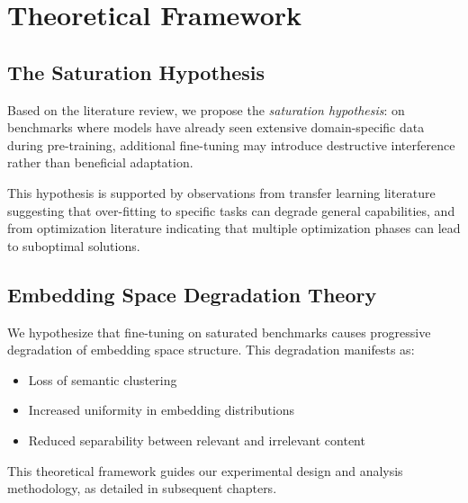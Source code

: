 \section{Theoretical Framework}

\subsection{The Saturation Hypothesis}

Based on the literature review, we propose the \textit{saturation hypothesis}: on benchmarks where models have already seen extensive domain-specific data during pre-training, additional fine-tuning may introduce destructive interference rather than beneficial adaptation.

This hypothesis is supported by observations from transfer learning literature suggesting that over-fitting to specific tasks can degrade general capabilities, and from optimization literature indicating that multiple optimization phases can lead to suboptimal solutions.

\subsection{Embedding Space Degradation Theory}

We hypothesize that fine-tuning on saturated benchmarks causes progressive degradation of embedding space structure. This degradation manifests as:

\begin{itemize}
\item Loss of semantic clustering
\item Increased uniformity in embedding distributions
\item Reduced separability between relevant and irrelevant content
\end{itemize}

This theoretical framework guides our experimental design and analysis methodology, as detailed in subsequent chapters.
